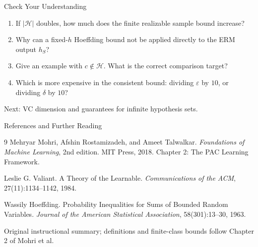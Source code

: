 \documentclass[aspectratio=169,10pt]{beamer}
\newcommand{\Hc}{\mathcal{H}}
\newcommand{\eps}{\varepsilon}
\begin{document}
\begin{frame}[t]{Check Your Understanding}
  \vspace{0.06cm}
  {\fontsize{14}{17.5}\selectfont
  \begin{enumerate}
    \setlength{\itemsep}{0.25cm}
    \item If $|\Hc|$ doubles, how much does the finite realizable sample bound increase?
    \item Why can a fixed-$h$ Hoeffding bound not be applied directly to the ERM output $h_S$?
    \item Give an example with $c\notin\Hc$. What is the correct comparison target?
    \item Which is more expensive in the consistent bound: dividing $\eps$ by $10$, or dividing $\delta$ by $10$?
  \end{enumerate}}
  \vfill
  \centering
  {\small\color{midgray}Next: VC dimension and guarantees for infinite hypothesis sets.}
\end{frame}

\begin{frame}[t]{References and Further Reading}
  \vspace{0.05cm}
  \small
  \begin{thebibliography}{9}
    \setlength{\itemsep}{0.22cm}
    Mehryar Mohri, Afshin Rostamizadeh, and Ameet Talwalkar.
    \newblock \emph{Foundations of Machine Learning}, 2nd edition.
    \newblock MIT Press, 2018. Chapter 2: The PAC Learning Framework.

    Leslie G. Valiant.
    \newblock A Theory of the Learnable.
    \newblock \emph{Communications of the ACM}, 27(11):1134--1142, 1984.

    Wassily Hoeffding.
    \newblock Probability Inequalities for Sums of Bounded Random Variables.
    \newblock \emph{Journal of the American Statistical Association}, 58(301):13--30, 1963.
  \end{thebibliography}
  \vspace{0.06cm}
  \centering
  {\scriptsize\color{midgray}Original instructional summary; definitions and finite-class bounds follow Chapter 2 of Mohri et al.}
\end{frame}
\end{document}
